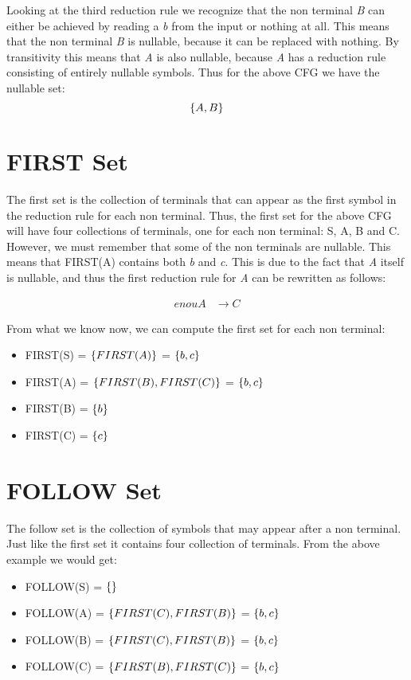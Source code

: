 Looking at the third reduction rule we recognize that the non terminal \textit{B} can either be achieved by reading a \textit{b} from the input or nothing at all. This means that the non terminal \textit{B} is nullable, because it can be replaced with nothing. By transitivity this means that \textit{A} is also nullable, because \textit{A} has a reduction rule consisting of entirely nullable symbols. Thus for the above CFG we have the nullable set:
\[\left\{A, B\right\}\]

\section{FIRST Set}

The first set is the collection of terminals that can appear as the first symbol in the reduction rule for each non terminal. Thus, the first set for the above CFG will have four collections of terminals, one for each non terminal: S, A, B and C. However, we must remember that some of the non terminals are nullable. This means that FIRST(A) contains both \textit{b} and \textit{c}. This is due to the fact that \textit{A} itself is nullable, and thus the first reduction rule for \textit{A} can be rewritten as follows:


\begin{equation*}
  \begin{split}enou
      A &\rightarrow C
  \end{split}
\end{equation*}

From what we know now, we can compute the first set for each non terminal:
\begin{itemize}
  \item FIRST(S) = $\left\{FIRST(A)\right\}$ = $\left\{b, c\right\}$
  \item FIRST(A) = $\left\{FIRST(B), FIRST(C)\right\}$ = $\left\{b, c\right\}$
  \item FIRST(B) = $\left\{b\right\}$
  \item FIRST(C) = $\left\{c\right\}$
\end{itemize}

\section{FOLLOW Set}

The follow set is the collection of symbols that may appear after a non terminal. Just like the first set it contains four collection of terminals. From the above example we would get:

\begin{itemize}
  \item FOLLOW(S) = $\left\{\right\}$
  \item FOLLOW(A) = $\left\{FIRST(C), FIRST(B)\right\}$ = $\left\{b, c\right\}$
  \item FOLLOW(B) = $\left\{FIRST(C), FIRST(B)\right\}$ = $\left\{b, c\right\}$
  \item FOLLOW(C) = $\left\{FIRST(B), FIRST(C)\right\}$ = $\left\{b, c\right\}$
\end{itemize}

